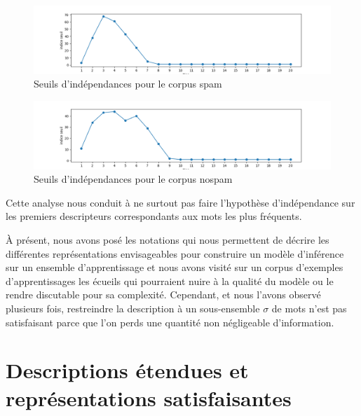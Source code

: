 \documentclass[a4paper, french]{article}
\begin{document}
\begin{figure}[h]
\begin{center}
    \caption{Seuils d'ind\'ependances pour le corpus spam}
    \label{fig:seuils_indes_spam}
    \includegraphics[width=15cm]{seuils_indes_nospam}
\end{center}
\end{figure}

\begin{figure}[h]
\begin{center}
    \caption{Seuils d'ind\'ependances pour le corpus nospam}
    \label{fig:seuils_indes_nospam}
    \includegraphics[width=15cm]{seuils_indes_spam}
\end{center}
\end{figure}

Cette analyse nous conduit \`a ne surtout pas faire l'hypoth\`ese
d'ind\'ependance sur les premiers descripteurs correspondants aux mots
les plus fr\'equents.

\`A pr\'esent, nous avons pos\'e les notations qui nous permettent
de d\'ecrire les diff\'erentes repr\'esentations envisageables pour
construire un mod\`ele d'inf\'erence sur un ensemble d'apprentissage
et nous avons visit\'e sur un corpus d'exemples d'apprentissages les
\'ecueils qui pourraient nuire \`a la qualit\'e du mod\`ele ou le rendre
discutable pour sa complexit\'e. Cependant, et nous l'avons observ\'e
plusieurs fois, restreindre la description \`a un sous-ensemble $\sigma$
de mots n'est pas satisfaisant parce que l'on perds une quantit\'e non
n\'egligeable d'information.

\section{Descriptions \'etendues et repr\'esentations satisfaisantes}

\end{document}
